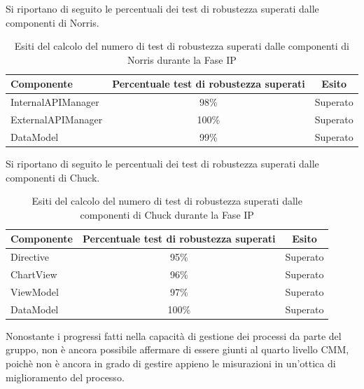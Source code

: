 	Si riportano di seguito le percentuali dei test di robustezza superati dalle componenti di Norris.
	\begin{table}[H]
		\centering
			\begin{tabu}{| l | c | c |}
				\hline
				Componente	& Percentuale test di robustezza superati	& Esito		\\ \hline \hline
				InternalAPIManager	& 98\% 	& Superato  \\ \hline
				ExternalAPIManager  & 100\%		& Superato  \\ \hline
				DataModel  & 99\%		& Superato  \\ \hline
			\end{tabu}
		\caption{Esiti del calcolo del numero di test di robustezza superati dalle componenti di Norris durante la Fase IP}
	\end{table}

	Si riportano di seguito le percentuali dei test di robustezza superati dalle componenti di Chuck.
	\begin{table}[H]
		\centering
			\begin{tabu}{| l | c | c |}
				\hline
				Componente	& Percentuale test di robustezza superati	& Esito		\\ \hline \hline
				Directive	& 95\% 	& Superato  \\ \hline
				ChartView  & 96\%		& Superato  \\ \hline
				ViewModel  & 97\%		& Superato  \\ \hline
				DataModel  & 100\%		& Superato  \\ \hline
			\end{tabu}
		\caption{Esiti del calcolo del numero di test di robustezza superati dalle componenti di Chuck durante la Fase IP}
	\end{table}


	Nonostante i progressi fatti nella capacità di gestione dei processi da parte del gruppo, non è ancora possibile affermare di essere giunti al quarto livello CMM, poichè non è ancora in grado di gestire appieno le misurazioni in un'ottica di miglioramento del processo.

